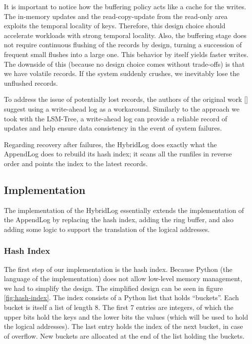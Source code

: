 It is important to notice how the buffering policy acts like a cache for the writes.
The in-memory updates and the read-copy-update from the read-only area exploits the temporal locality of keys.
Therefore, this design choice should accelerate workloads with strong temporal locality. Also, the buffering stage does not require continuous flushing of the records by design, turning a succession of frequent small flushes into a large one. This behavior by itself yields faster writes. The downside of this (because no design choice comes without trade-offs) is that we have volatile records. If the system suddenly crushes, we inevitably lose the unflushed records.

To address the issue of potentially lost records, the authors of the original work [\cite{faster}] suggest using a write-ahead log as a workaround.
Similarly to the approach we took with the LSM-Tree, a write-ahead log can provide a reliable record of updates and help ensure data consistency in the event of system failures.

Regarding recovery after failures, the HybridLog does exactly what the AppendLog does to rebuild its hash index; it scans all the runfiles in reverse order and points the index to the latest records.

\subsection{Implementation}

The implementation of the HybridLog essentially extends the implementation of the AppendLog by replacing the hash index, adding the ring buffer, and also adding some logic to support the translation of the logical addresses.

\subsubsection{Hash Index}

The first step of our implementation is the hash index. Because Python (the language of the implementation) does not allow low-level memory management, we had to simplify the design.
The simplified design can be seen in figure \ref{fig:hash-index}.
The index consists of a Python list that holds ``buckets''.
Each bucket is itself a list of length 8. The first 7 entries are integers, of which the upper bits hold the keys and the lower bits the values (which will be used to hold the logical addresses). The last entry holds the index of the next bucket, in case of overflow.
New buckets are allocated at the end of the list holding the buckets.

